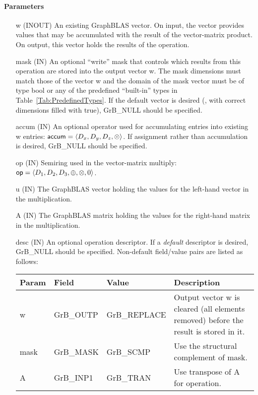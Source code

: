 \paragraph{Parameters}

\begin{itemize}[leftmargin=1.1in]
    \item[{\sf w}]    ({\sf INOUT}) An existing GraphBLAS vector.  On input,
    the vector provides values that may be accumulated with the result of the
    vector-matrix product.  On output, this vector holds the results of the
    operation.

    \item[{\sf mask}] ({\sf IN}) An optional ``write'' mask that controls which
    results from this operation are stored into the output vector {\sf w}. The 
    mask dimensions must match those of the vector {\sf w} and the domain of the
    {\sf mask} vector must be of type {\sf bool} or any of the predefined 
    ``built-in'' types in Table~\ref{Tab:PredefinedTypes}.  If the default vector
    is desired (\ie, with correct dimensions filled with {\sf true}), 
    {\sf GrB\_NULL} should be specified.

    \item[{\sf accum}] ({\sf IN}) An optional operator used for accumulating
    entries into existing {\sf w} entries: ${\sf accum} = \langle D_x,
    D_y, D_z,\odot \rangle$. If assignment rather than accumulation is
    desired, {\sf GrB\_NULL} should be specified.

    \item[{\sf op}]   ({\sf IN}) Semiring used in the vector-matrix
    multiply: ${\sf op}=\langle D_1,D_2,D_3,\oplus,\otimes,0 \rangle$.
    
    \item[{\sf u}]    ({\sf IN}) The GraphBLAS vector holding the values for
    the left-hand vector in the multiplication.
    
    \item[{\sf A}]    ({\sf IN}) The GraphBLAS matrix holding the values
    for the right-hand matrix in the multiplication.

    \item[{\sf desc}] ({\sf IN}) An optional operation descriptor. If
    a \emph{default} descriptor is desired, {\sf GrB\_NULL} should be
    specified. Non-default field/value pairs are listed as follows:  \\

    \begin{tabular}{lllp{2.5in}}
    Param & Field  & Value & Description \\
    \hline
    {\sf w}    & {\sf GrB\_OUTP} & {\sf GrB\_REPLACE} & Output vector {\sf w} is cleared (all elements removed) before the result is stored in it.\\
    {\sf mask} & {\sf GrB\_MASK} & {\sf GrB\_SCMP}   & Use the structural complement of {\sf mask}. \\
    {\sf A}    & {\sf GrB\_INP1} & {\sf GrB\_TRAN}   & Use transpose of {\sf A} for operation. \\
    \end{tabular}
\end{itemize}

